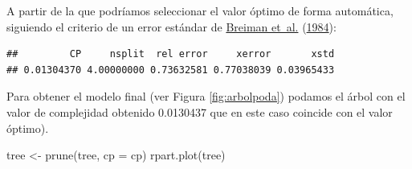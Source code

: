 \documentclass[
  spanish,
]{book}
\newenvironment{Shaded}{\begin{snugshade}}{\end{snugshade}}
\newcommand{\AttributeTok}[1]{\textcolor[rgb]{0.77,0.63,0.00}{#1}}
\newcommand{\CommentTok}[1]{\textcolor[rgb]{0.56,0.35,0.01}{\textit{#1}}}
\newcommand{\FunctionTok}[1]{\textcolor[rgb]{0.00,0.00,0.00}{#1}}
\newcommand{\NormalTok}[1]{#1}
\newcommand{\OtherTok}[1]{\textcolor[rgb]{0.56,0.35,0.01}{#1}}
\newcommand{\SpecialCharTok}[1]{\textcolor[rgb]{0.00,0.00,0.00}{#1}}
\newcommand{\StringTok}[1]{\textcolor[rgb]{0.31,0.60,0.02}{#1}}
\theoremstyle{break}
\theoremstyle{definition}
\theoremstyle{definition}
\theoremstyle{definition}
\theoremstyle{definition}
\theoremstyle{remark}
\begin{document}
A partir de la que podríamos seleccionar el valor óptimo de forma automática,
siguiendo el criterio de un error estándar de \protect\hyperlink{ref-breiman1984classification}{Breiman et~al.} (\protect\hyperlink{ref-breiman1984classification}{1984}):

\begin{Shaded}
\end{Shaded}

\begin{verbatim}
##         CP     nsplit  rel error     xerror       xstd 
## 0.01304370 4.00000000 0.73632581 0.77038039 0.03965433
\end{verbatim}

\begin{Shaded}
\end{Shaded}

Para obtener el modelo final (ver Figura \ref{fig:arbolpoda}) podamos el árbol con el valor de complejidad obtenido 0.0130437 que en este caso coincide con el valor óptimo).

\begin{Shaded}
\begin{Highlighting}[]
\NormalTok{tree }\OtherTok{\textless{}{-}} \FunctionTok{prune}\NormalTok{(tree, }\AttributeTok{cp =}\NormalTok{ cp)}
\FunctionTok{rpart.plot}\NormalTok{(tree) }
\end{Highlighting}
\end{Shaded}
\end{document}
